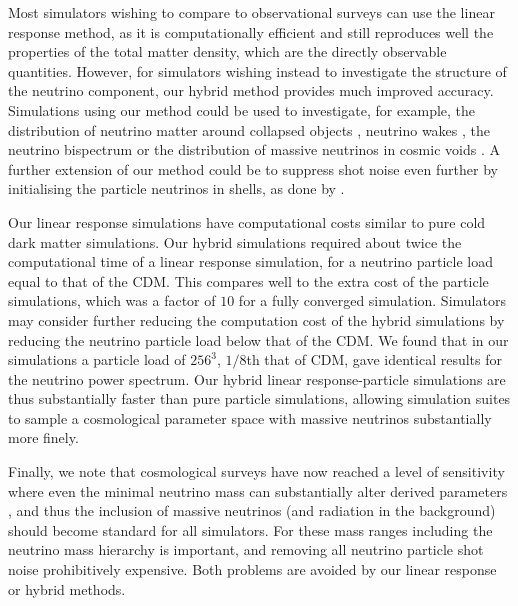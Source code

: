 \documentclass[useAMS, usenatbib]{mnras}
\begin{document}

Most simulators wishing to compare to observational surveys can use the linear response method, as it is computationally efficient and still reproduces well the properties of the total matter density, which are the directly observable quantities. However, for simulators wishing instead to investigate the structure of the neutrino component, our hybrid method provides much improved accuracy. Simulations using our method could be used to investigate, for example, the distribution of neutrino matter around collapsed objects \citep{FVN_2013}, neutrino wakes \citep{Inman_2015}, the neutrino bispectrum \citep{Furhrer_2015} or the distribution of massive neutrinos in cosmic voids \citep{Banerjee_2016}. A further extension of our method could be to suppress shot noise even further by initialising the particle neutrinos in shells, as done by \cite{Banerjee_2018}.

Our linear response simulations have computational costs similar to pure cold dark matter simulations. Our hybrid simulations required about twice the computational time of a linear response simulation, for a neutrino particle load equal to that of the CDM. This compares well to the extra cost of the particle simulations, which was a factor of $10$ for a fully converged simulation. Simulators may consider further reducing the computation cost of the hybrid simulations by reducing the neutrino particle load below that of the CDM. We found that in our simulations a particle load of $256^3$, $1/8$th that of CDM, gave identical results for the neutrino power spectrum. Our hybrid linear response-particle simulations are thus substantially faster than pure particle simulations, allowing simulation suites to sample a cosmological parameter space with massive neutrinos substantially more finely.

Finally, we note that cosmological surveys have now reached a level of sensitivity where even the minimal neutrino mass can substantially alter derived parameters \citep{Calabrese_2017}, and thus the inclusion of massive neutrinos (and radiation in the background) should become standard for all simulators. For these mass ranges including the neutrino mass hierarchy is important, and removing all neutrino particle shot noise prohibitively expensive. Both problems are avoided by our linear response or hybrid methods.
\end{document}
